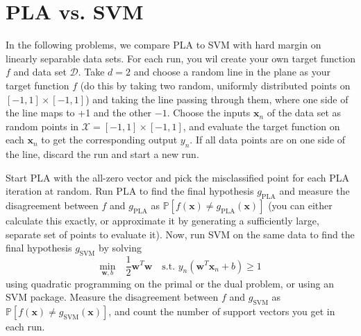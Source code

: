 \documentclass[answers]{exam}
\begin{document}
\section*{\textbf{PLA vs. SVM}}
In the following problems, we compare PLA to SVM with hard margin on linearly
separable data sets. For each run, you wil create your own target function $f$
and data set $\mathcal{D}$. Take $d=2$ and choose a random line in the plane
as your target function $f$ (do this by taking two random, uniformly distributed
points on $[-1,1] \times [-1, 1]$) and taking the line passing through them, 
where one side of the line maps to +1 and the other $-1$. Choose the inputs 
$\textbf{x}_{n}$ of the data set as random points in $\mathcal{X}=[-1,1] \times 
[-1, 1]$, and evaluate the target function on each $\textbf{x}_{n}$ to get the 
corresponding output $y_{n}$. If all data points are on one side of the line, 
discard the run and start a new run. 

Start PLA with the all-zero vector and pick the misclassified point for each PLA
iteration at random. Run PLA to find the final hypothesis $g_{\text{PLA}}$ and 
measure the disagreement between $f$ and $g_{\text{PLA}}$ as $\mathbb{P}[
f(\textbf{x}) \neq  g_{\text{PLA}}(\textbf{x})]$ (you can either calculate this
exactly, or approximate it by generating a sufficiently large, separate set of 
points to evaluate it). Now, run SVM on the same data to find the final 
hypothesis $g_{\text{SVM}}$ by solving
\[
\underset{\textbf{w}, b}{\text{min}} \quad \frac{1}{2} \textbf{w}^{T}\textbf{w} \quad \text{s.t. } y_{n}(\textbf{w}^{T}\textbf{x}_{n} + b) \ge 1
\] 
using quadratic programming on the primal or the dual problem, or using an SVM
package. Measure the disagreement between $f$ and $g_{\text{SVM}}$ as 
$\mathbb{P}[f(\textbf{x}) \neq g_{\text{SVM}}(\textbf{x})]$, and count the 
number of support vectors you get in each run.
\end{document}
